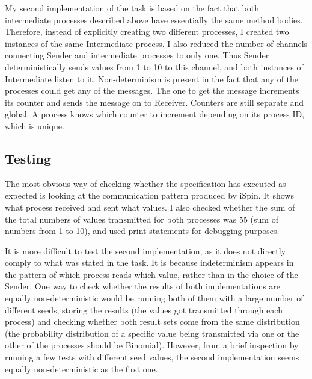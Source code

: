 \documentclass{report}
\newcommand{\tab}{\hspace*{3em}}
\begin{document}
\par My second implementation of the task is based on the fact that both intermediate processes described above have essentially the same method bodies. Therefore, instead of explicitly creating two different processes, I created two instances of the same Intermediate process. I also reduced the number of channels connecting Sender and intermediate processes to only one. Thus Sender deterministically sends values from 1 to 10 to this channel, and both instances of Intermediate listen to it. Non-determinism is present in the fact that any of the processes could get any of the messages. The one to get the message increments its counter and sends the message on to Receiver. Counters are still separate and global. A process knows which counter to increment depending on its process ID, which is unique.

\subsection*{Testing}
\tab The most obvious way of checking whether the specification has executed as expected is looking at the communication pattern produced by iSpin. It shows what process received and sent what values. I also checked whether the sum of the total numbers of values transmitted for both processes was 55 (sum of numbers from 1 to 10), and used print statements for debugging purposes.
\par It is more difficult to test the second implementation, as it does not directly comply to what was stated in the task. It is because indeterminism appears in the pattern of which process reads which value, rather than in the choice of the Sender. One way to check whether the results of both implementations are equally non-deterministic would be running both of them with a large number of different seeds, storing the results (the values got transmitted through each process) and checking whether both result sets come from the same distribution (the probability distribution of a specific value being transmitted via one or the other of the processes should be Binomial). However, from a brief inspection by running a few tests with different seed values, the second implementation seems equally non-deterministic as the first one.
\end{document}
